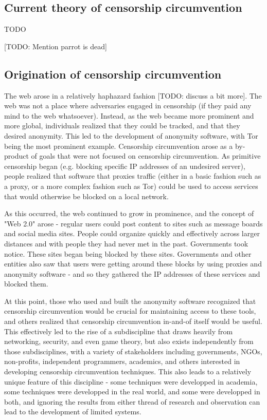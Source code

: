 \documentclass[12pt]{report}
\begin{document}
\subsection{Current theory of censorship circumvention}

TODO

[TODO: Mention parrot is dead]

\subsection{Origination of censorship circumvention}

The web arose in a relatively haphazard fashion [TODO: discuss a bit more]. The web was not a place where adversaries engaged in censorship (if they paid any mind to the web whatsoever). Instead, as the web became more prominent and more global, individuals realized that they could be tracked, and that they desired anonymity. This led to the development of anonymity software, with Tor being the most prominent example. Censorship circumvention arose as a by-product of goals that were not focused on censorship circumvention. As primitive censorship began (e.g. blocking specific IP addresses of an undesired server), people realized that software that proxies traffic (either in a basic fashion such as a proxy, or a more complex fashion such as Tor) could be used to access services that would otherwise be blocked on a local network.

As this occurred, the web continued to grow in prominence, and the concept of "Web 2.0" arose - regular users could post content to sites such as message boards and social media sites. People could organize quickly and effectively across larger distances and with people they had never met in the past. Governments took notice. These sites began being blocked by these sites. Governments and other entities also saw that users were getting around these blocks by using proxies and anonymity software - and so they gathered the IP addresses of these services and blocked them.

At this point, those who used and built the anonymity software recognized that censorship circumvention would be crucial for maintaining access to these tools, and others realized that censorship circumvention in-and-of itself would be useful. This effectively led to the rise of a subdiscipline that draws heavily from networking, security, and even game theory, but also exists independently from those subdisciplines, with a variety of stakeholders including governments, NGOs, non-profits, independent programmers, academics, and others interested in developing censorship circumvention techniques. This also leads to a relatively unique feature of this discipline - some techniques were developped in academia, some techniques were developped in the real world, and some were developped in both, and ignoring the results from either thread of research and observation can lead to the development of limited systems.
\end{document}
